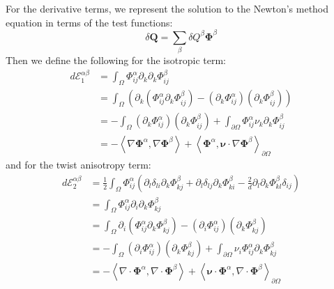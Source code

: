 \documentclass[reqno]{article}
\newcommand{\Q}{\mathbf{Q}}
\begin{document}
For the derivative terms, we represent the solution to the Newton's method equation in terms of the test functions:
\begin{equation}
    \delta \Q
    =
    \sum_\beta
    \delta Q^\beta \boldsymbol \Phi^\beta
\end{equation}
Then we define the following for the isotropic term:
\begin{equation}
\begin{split}
    d\mathcal E_1^{\alpha \beta}
    &=
    \int_\Omega
    \Phi^\alpha_{ij} \partial_k \partial_k \Phi^\beta_{ij} \\
    &=
    \int_\Omega
    \left(
        \partial_k \left( \Phi^\alpha_{ij} \partial_k \Phi^\beta_{ij} \right)
        - \left( \partial_k \Phi^\alpha_{ij} \right) \left( \partial_k \Phi^\beta_{ij} \right)
    \right) \\
    &=
    -\int_\Omega \left( \partial_k \Phi^\alpha_{ij} \right) \left( \partial_k \Phi^\beta_{ij} \right)
    + \int_{\partial \Omega}\Phi^\alpha_{ij} \nu_k \partial_k \Phi^\beta_{ij} \\
    &=
    -\left< \nabla \boldsymbol \Phi^\alpha, \nabla \boldsymbol \Phi^\beta \right>
    + \left< \boldsymbol \Phi^\alpha, \boldsymbol \nu \cdot \nabla \boldsymbol \Phi^\beta \right>_{\partial \Omega}
\end{split}
\end{equation}
and for the twist anisotropy term:
\begin{equation}
\begin{split}
    d \mathcal E_2^{\alpha \beta}
    &=
    \frac12 \int_\Omega 
    \Phi_{ij}^\alpha \left(
        \partial_l \delta_{li} \partial_k \Phi^\beta_{kj}
        + \partial_l \delta_{lj} \partial_k \Phi^\beta_{ki}
        - \tfrac2d \partial_l \partial_k \Phi^\beta_{kl} \delta_{ij}
    \right) \\
    &=
    \int_\Omega
    \Phi_{ij}^\alpha \partial_i \partial_k \Phi^\beta_{kj} \\
    &=
    \int_\Omega
    \partial_i \left( \Phi^\alpha_{ij} \partial_k \Phi^\beta_{kj} \right)
    - \left( \partial_i \Phi^\alpha_{ij} \right) \left( \partial_k \Phi^\beta_{kj} \right) \\
    &=
    - \int_\Omega\left( \partial_i \Phi^\alpha_{ij} \right) \left( \partial_k \Phi^\beta_{kj} \right) 
    + \int_{\partial \Omega} \nu_i \Phi^\alpha_{ij} \partial_k \Phi^\beta_{kj} \\
    &=
    - \left< \nabla \cdot \boldsymbol \Phi^\alpha, \nabla \cdot \boldsymbol \Phi^\beta \right>
    + \left< \boldsymbol \nu \cdot \boldsymbol \Phi^\alpha, \nabla \cdot \boldsymbol \Phi^\beta \right>_{\partial \Omega}
\end{split}
\end{equation}
\end{document}
